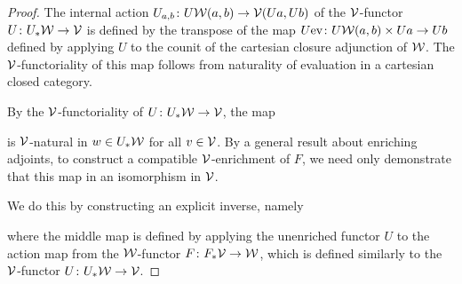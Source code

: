 \begin{proof}
The internal action $U_{a,b} \colon U{\mathord{\mathcal{W}}}(a,b) \to {\mathord{\mathcal{V}}}(Ua,Ub)$ of the ${\mathord{\mathcal{V}}}$-functor $U \colon U_*{\mathord{\mathcal{W}}} \to {\mathord{\mathcal{V}}}$ is defined by the transpose of the map $U\textup{ev} \colon U{\mathord{\mathcal{W}}}(a,b) \times Ua \to Ub$ defined by applying $U$ to the counit of the cartesian closure adjunction of ${\mathord{\mathcal{W}}}$. The ${\mathord{\mathcal{V}}}$-functoriality of this map follows from naturality of evaluation in a cartesian closed category.


By the ${\mathord{\mathcal{V}}}$-functoriality of $U \colon U_*{\mathord{\mathcal{W}}} \to {\mathord{\mathcal{V}}}$, the map
\begin{center}
\end{center}
is ${\mathord{\mathcal{V}}}$-natural in $w \in U_*{\mathord{\mathcal{W}}}$ for all $v \in {\mathord{\mathcal{V}}}$. By a general result about enriching adjoints,  %
to construct a compatible ${\mathord{\mathcal{V}}}$-enrichment of $F$, we need only demonstrate that this map in an isomorphism in ${\mathord{\mathcal{V}}}$.

We do this by constructing an explicit inverse, namely
\begin{center}
\end{center}
where the middle map is defined by applying the unenriched functor $U$ to the action map from the ${\mathord{\mathcal{W}}}$-functor $F \colon F_*{\mathord{\mathcal{V}}} \to {\mathord{\mathcal{W}}}$, which is defined similarly to the ${\mathord{\mathcal{V}}}$-functor $U \colon U_*{\mathord{\mathcal{W}}} \to {\mathord{\mathcal{V}}}$.


\end{proof}
